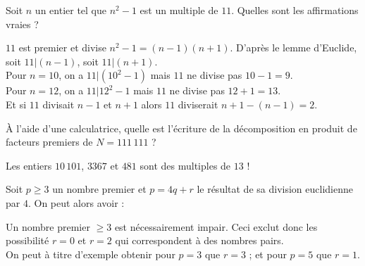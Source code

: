 \begin{question}
    Soit $n$ un entier tel que $n^2-1$ est un multiple de $11$. Quelles sont les affirmations vraies ?
    \begin{answers} 
    \end{answers}
    \begin{explanations} 
    $11$ est premier et divise $n^2-1 = (n-1)(n+1)$. D'après le lemme d'Euclide, soit $11 | (n-1)$, soit $11 | (n+1)$.\\
    Pour $n=10$, on a $11 | (10^2-1)$ mais $11$ ne divise pas $10-1=9$.\\
    Pour $n=12$, on a $11 | 12^2 - 1$ mais $11$ ne divise pas $12+1=13$.\\
    Et si $11$ divisait $n-1$ et $n+1$ alors $11$ diviserait  $n+1-(n-1) = 2$.
    \end{explanations}
\end{question}


\begin{question}
    À l'aide d'une calculatrice, quelle est l'écriture de la décomposition en produit de facteurs premiers de $N = 111 \, 111$ ?
    \begin{answers} 
    \end{answers}
    \begin{explanations} 
    Les entiers $10\,101$, $3367$ et $481$ sont des multiples de $13$ !
    \end{explanations}
\end{question}


\begin{question}
 Soit $p \geq 3$ un nombre premier et $ p = 4q + r$ le résultat de sa division euclidienne par $4$. On peut alors avoir :
    \begin{answers} 
    \end{answers}
    \begin{explanations} 
    Un nombre premier $\geq 3$ est nécessairement impair. Ceci exclut donc les possibilité $r=0$ et $r=2$ qui correspondent à des nombres pairs.\\
    On peut à titre d'exemple obtenir pour $p=3$ que $r=3$ ; et pour $p=5$ que  $r=1$.
    \end{explanations}
\end{question}



